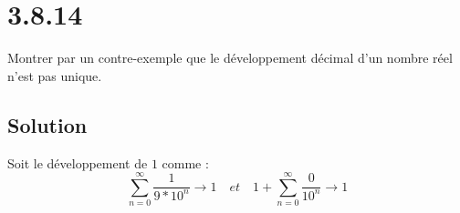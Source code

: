 \section*{3.8.14}
	Montrer par un contre-exemple que le développement décimal d'un nombre réel n'est pas unique.
	\subsection*{Solution}
	Soit le développement de $1$ comme :
	\[\sum_{n=0}^{\infty}\frac{1}{9*10^n}\longrightarrow 1\quad et\quad 1+\sum_{n=0}^{\infty}\frac{0}{10^n}\longrightarrow 1\]